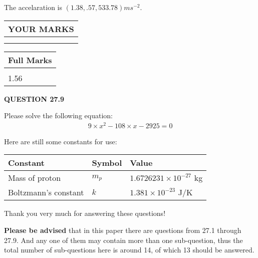 \documentclass[12pt]{article}
\begin{document}
 
  The accelaration is $  %
(
1.38,
.57,
533.78)
ms^{-2} $.
 
 
 

 
 
\vspace{0.3in}
  
\vspace{0.2in}
  
\noindent\begin{tabular}{|l|}
\hline
 YOUR MARKS  \\
\hline
 \\ 
 \\ 
\hline
\end{tabular}
\hspace{0.05in} \begin{tabular}{|l|}
\hline
 Full Marks  \\
\hline
 \\ 
1.56 \\
\hline
\end{tabular}
{\textbf{\Large{QUESTION
27.9 
}}}
  
  
 
 

 
Please solve the following equation:
\begin{eqnarray*}
9 \times x^2  %
-108
                 \times x    %
-2925 =0
\end{eqnarray*}
 

 

 
\vspace{0.3in}
   
   
 \vspace{0.2in}
Here are still some constants for use:
 
 
\noindent\begin{tabular}{|l|l|l|}
\hline
Constant & Symbol & Value \\
\hline
 
Mass of proton &
$m_p$ &
 $ 1.6726231 \times 10^{-27} $
kg \\
\hline
 
Boltzmann's constant &
$k$ &
 $ 1.381 \times 10^{-23} $
J/K \\
\hline
 
\end{tabular}
 
Thank you very much for answering these questions!
 
{\textbf{\large{Please be advised}}} that in this paper there are questions from
27.1 through
27.9.
And any one of them may contain more than one sub-question, thus the total number
of sub-questions here is around 14, of which
13 should be answered.
 
\end{document}
